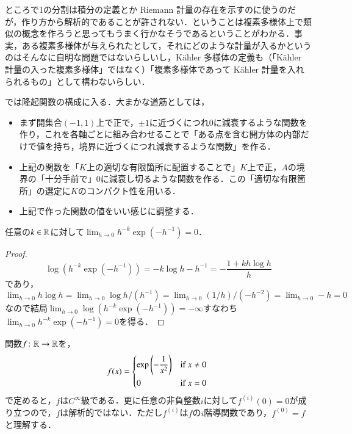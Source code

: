 \begin{que}[**]
ところで1の分割は積分の定義とか Riemann 計量の存在を示すのに使うのだが，作り方から解析的であることが許されない．ということは複素多様体上で類似の概念を作ろうと思ってもうまく行かなそうであるということがわかる．事実，ある複素多様体が与えられたとして，それにどのような計量が入るかというのはそんなに自明な問題ではないらしいし，K\"ahler 多様体の定義も（「K\"ahler 計量の入った複素多様体」ではなく）「複素多様体であって K\"ahler 計量を入れられるもの」として構わないらしい．
\end{que}

では隆起関数の構成に入る．大まかな道筋としては，
\begin{itemize}
\item まず開集合$(-1,1)$上で正で，$\pm 1$に近づくにつれ0に減衰するような関数を作り，これを各軸ごとに組み合わせることで「ある点を含む開方体の内部だけで値を持ち，境界に近づくにつれ減衰するような関数」を作る．
\item 上記の関数を「$K$上の適切な有限箇所に配置することで」$K$上で正，$A$の境界の「十分手前で」0に減衰し切るような関数を作る．この「適切な有限箇所」の選定に$K$のコンパクト性を用いる．
\item 上記で作った関数の値をいい感じに調整する．
\end{itemize}

\begin{lem}\label{指数関数は多項式に優越する}
任意の$k \in \mathbb{R}$に対して$\lim_{h \to 0} h^{-k} \exp (-h^{-1}) =0$．
\end{lem}

\begin{proof}
\begin{equation}
\log \left(h^{-k} \exp (-h^{-1})\right) = -k \log h - h^{-1} = -\frac{1+kh \log h}{h}
\end{equation}であり，$\lim_{h \to 0} h \log h = \lim_{h \to 0} \log h /(h^{-1}) =  \lim_{h \to 0}  (1/h) /(-h^{-2}) = \lim_{h \to 0} - h = 0$なので結局$\lim_{h \to 0} \log \left(h^{-k} \exp (-h^{-1})\right) = - \infty$すなわち$\lim_{h \to 0} h^{-k} \exp (-h^{-1}) =0$を得る．
\end{proof}

\begin{prop}
関数$f \colon \mathbb{R} \to \mathbb{R}$を，
\begin{equation}
f(x) =   \begin{dcases*}
    \exp\left(-\frac{1}{x^2}\right) & if $x \neq 0$ \\
    0 & if $x=0$
  \end{dcases*}
\end{equation}
で定めると，$f$は$C^\infty$級である．更に任意の非負整数$i$に対して$f^{(i)}(0)=0$が成り立つので，$f$は解析的ではない．ただし$f^{(i)}$は$f$の$i$階導関数であり，$f^{(0)}=f$と理解する．
\end{prop}

